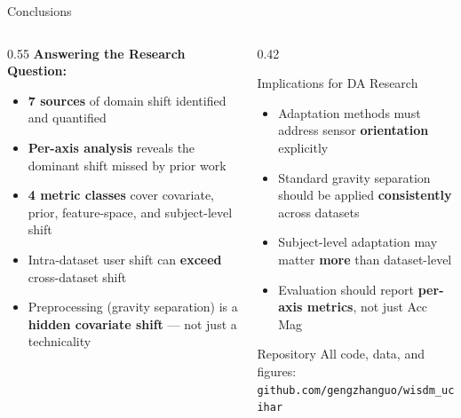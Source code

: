 \documentclass[aspectratio=169, 10pt]{beamer}
\begin{document}
\begin{frame}{Conclusions}
  \begin{columns}[T]
    \begin{column}{0.55\textwidth}
      \textbf{Answering the Research Question:}
      \vspace{2mm}
      \begin{itemize}
        \item[\checkmark] \textbf{7 sources} of domain shift identified and quantified
        \item[\checkmark] \textbf{Per-axis analysis} reveals the dominant shift missed by prior work
        \item[\checkmark] \textbf{4 metric classes} cover covariate, prior, feature-space, and subject-level shift
        \item[\checkmark] Intra-dataset user shift can \textbf{exceed} cross-dataset shift
        \item[\checkmark] Preprocessing (gravity separation) is a \textbf{hidden covariate shift} — not just a technicality
      \end{itemize}
    \end{column}

    \begin{column}{0.42\textwidth}
      \begin{block}{Implications for DA Research}
        \begin{itemize}
          \small
          \item Adaptation methods must address sensor \textbf{orientation} explicitly
          \item Standard gravity separation should be applied \textbf{consistently} across datasets
          \item Subject-level adaptation may matter \textbf{more} than dataset-level
          \item Evaluation should report \textbf{per-axis metrics}, not just Acc Mag
        \end{itemize}
      \end{block}

      \vspace{3mm}
      \begin{exampleblock}{Repository}
        \small All code, data, and figures:\\
        \texttt{github.com/gengzhanguo/wisdm\_ucihar}
      \end{exampleblock}
    \end{column}
  \end{columns}
\end{frame}
\end{document}
